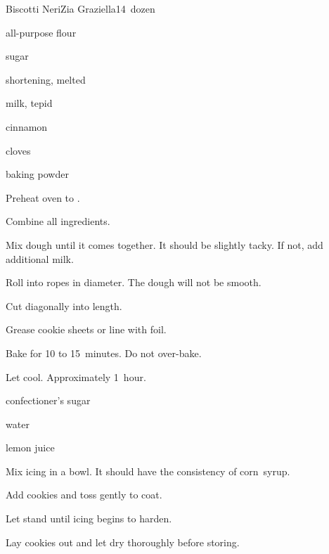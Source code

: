 \begin{recipe}{Biscotti Neri}{Zia Graziella}{14~dozen}

\begin{ingredients}
\item {} all-purpose flour
\item \C{\half} sugar
\item \lbs{\quarter} shortening, melted
\item {} milk, tepid
\item \Tp{1\half} 
\item {} cinnamon
\item \tp{\half} cloves
\item {} baking powder
\end{ingredients}

\begin{directions}
\item Preheat oven to .
\item Combine all ingredients.
\item Mix dough until it comes together. It should be slightly tacky. If not, add additional milk.
\item Roll into ropes \inch{\quarter} in diameter. The dough will not be smooth.
\item Cut diagonally into  length.
\item Grease cookie sheets or line with foil.
\item Bake for 10 to 15~minutes. Do not over-bake.
\item Let cool. Approximately 1~hour.
\end{directions}



\begin{ingredients}
\item confectioner's sugar
\item water
\item lemon juice
\end{ingredients}

\begin{directions}
\item Mix icing in a bowl. It should have the consistency of corn~syrup.
\item Add cookies and toss gently to coat.
\item Let stand until icing begins to harden.
\item Lay cookies out and let dry thoroughly before storing.
\end{directions}

\end{recipe}
